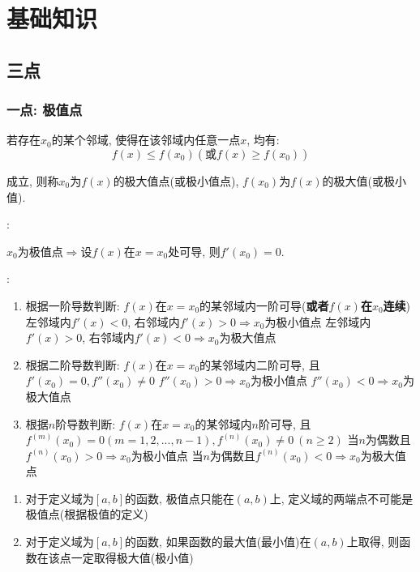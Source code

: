 \section{基础知识}
\subsection{三点}
\subsubsection{一点: 极值点}
若存在$ x_{0} $的某个邻域, 使得在该邻域内任意一点$ x $, 均有:
\begin{equation*}
    f(x)\le f(x_{0})(\text{或}f(x)\ge f(x_{0}))
\end{equation*}\par
成立, 则称$ x_{0} $为$ f(x) $的极大值点(或极小值点), $ f(x_{0}) $为$ f(x) $的极大值(或极小值).\par \vspace{.5em}
:\par \vspace{.5em}
$ x_{0} $为极值点$ \Rightarrow $设$ f(x) $在$ x=x_{0} $处可导, 则$ f'(x_{0})=0 $.\par \vspace{.5em}
:
\begin{enumerate}
    \item 根据一阶导数判断: $ f(x) $在$ x=x_{0} $的某邻域内一阶可导(\textbf{或者$ f(x) $在$ x_{0} $连续})
          \subitem 左邻域内$ f'(x)<0 $, 右邻域内$ f'(x)>0\Rightarrow x_{0} $为极小值点
          \subitem 左邻域内$ f'(x)>0 $, 右邻域内$ f'(x)<0\Rightarrow x_{0} $为极大值点
    \item 根据二阶导数判断: $ f(x) $在$ x=x_{0} $的某邻域内二阶可导, 且$ f'(x_{0})=0, f''(x_{0})\neq 0 $
          \subitem $ f''(x_{0})>0\Rightarrow x_{0} $为极小值点
          \subitem $ f''(x_{0})<0\Rightarrow x_{0} $为极大值点
    \item 根据$ n $阶导数判断: $ f(x) $在$ x=x_{0} $的某邻域内$ n $阶可导, 且$ f^{(m)}(x_{0})=0(m=1,2,...,n-1), f^{(n)}(x_{0})\neq 0\ (n\ge 2) $
          \subitem 当$ n $为偶数且$ f^{(n)}(x_{0})>0\Rightarrow x_{0} $为极小值点
          \subitem 当$ n $为偶数且$ f^{(n)}(x_{0})<0\Rightarrow x_{0} $为极大值点
\end{enumerate}
\begin{tcolorbox}
    \begin{enumerate}
        \item 对于定义域为$ [a,b] $的函数, 极值点只能在$ (a,b) $上, 定义域的两端点不可能是极值点(根据极值的定义)
        \item 对于定义域为$ [a,b] $的函数, 如果函数的最大值(最小值)在$ (a,b) $上取得, 则函数在该点一定取得极大值(极小值)
    \end{enumerate}
\end{tcolorbox}
